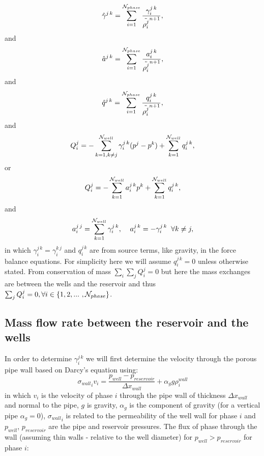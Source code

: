 \begin{equation}
\hat\gamma^{j\,k}=\sum_{i=1}^{ {\cal N}_{phase} }  \frac{ \gamma^{j\,k}_i }{ \tilde{\rho_i^j}^{n+1} },
\label{saturation_wells_6}
\end{equation}
and
\begin{equation}
\hat a^{j\,k}=\sum_{i=1}^{ {\cal N}_{phase} }  \frac{ a^{j\,k}_i }{ \tilde{\rho_i^j}^{n+1} },
\label{saturation_wells_6-a}
\end{equation}
and
\begin{equation}
\hat q^{j\,k}=\sum_{i=1}^{ {\cal N}_{phase} }  \frac{ q^{j\,k}_i }{ \tilde{\rho_i^j}^{n+1} },
\label{saturation_wells_6b}
\end{equation}
and
\begin{equation}
Q_i^{j} =
-\sum_{k=1, k\neq j}^{{\cal N}_{well}}\gamma^{j\,k}_i  (p^j - p^k)
+ \sum_{k=1}^{{\cal N}_{well}} q^{j\,k}_i,
\label{saturation_wells_7}
\end{equation}
or
\begin{equation}
Q_i^{j} =
-\sum_{k=1}^{{\cal N}_{well}} a^{j\,k}_i  p^k
+ \sum_{k=1}^{{\cal N}_{well}} q^{j\,k}_i,
\label{saturation_wells_7-a}
\end{equation}
and
\begin{equation}
a^{j\,j}_i= \sum_{k=1}^{ {\cal N}_{well} }  \gamma^{j\,k}_i , \;\;\;\;
a^{j\,k}_i=  -  \gamma^{j\,k}_i \;\; \forall k\neq j ,
\label{saturation_wells_8-a}
\end{equation}
in which $\gamma^{j\,k}_i=\gamma^{k\,j}_i$ and $q^{j\,k}_i$ are from source terms, like gravity, in the
force balance equations. For simplicity here we will assume $q^{j\,k}_i=0$ unless otherwise stated.
From conservation of mass $\sum_i\sum_j Q^j_i=0$ but here the mass exchanges are between the wells and
the reservoir and thus $\sum_j Q^j_i=0, \forall i \in\{ 1,2,...~ , {\cal N}_{phase}\}$.


\subsection{Mass flow rate between the reservoir and the wells}
\label{Mass flow rate between the reservoir and the wells}
In order to determine $\gamma^{j\,k}_i$ we will first determine the
velocity through the porous pipe wall based on Darcy's equation using:
\begin{equation}
{\sigma_{wall}}_i v_i = \frac{ p_{well} - p_{reservoir} }{{\Delta x}_{wall}} +\alpha_g g \rho_i^{wall}
\label{saturation_wells_8}
\end{equation}
in which $v_i$ is the velocity of phase $i$ through the pipe wall of thickness ${\Delta x}_{wall}$ and normal to the pipe,
$g$ is gravity, $\alpha_g$ is the component of gravity (for a vertical pipe $\alpha_g=0$),
${\sigma_{wall}}_i$ is related to the permeability of the well wall for phase $i$
and
$p_{well}$,  $p_{reservoir}$ are the pipe and reservoir pressures.
The flux of phase through the wall (assuming thin walls - relative to the well diameter)
for $p_{well}>p_{reservoir}$ for phase $i$:

